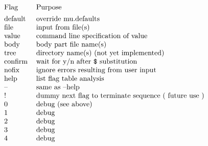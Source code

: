 \[\begin{tabular}{ll}
Flag    &       Purpose\\[1ex]

default &       override mu.defaults\\
file    &       input from file(s)\\
value   &       command line specification of value\\
body    &       body part file name(s)\\
tree    &       directory name(s) (not yet implemented)\\
confirm &       wait for y/n after \verb+$+ substitution\\
nofix   &       ignore errors resulting from user input\\
help    &       list flag table analysis\\
--      &       same as --help\\
!       &       dummy next flag to terminate sequence ( future use )\\
0       &       debug (see above)\\
1       &       debug\\
2       &       debug\\
3       &       debug\\
4       &       debug\\

\end{tabular}\]
